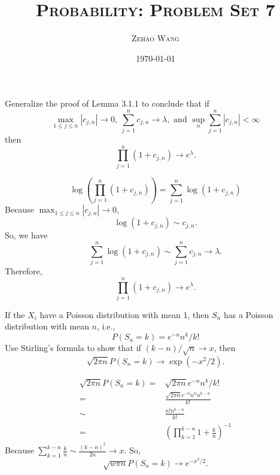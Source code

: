 \documentclass[en, normal, 12pt, black]{elegantnote}
\title{\textsc{Probability: Problem Set 7}}
\author{\textsc{Zehao Wang}}
\date{\today}
\newenvironment{exercise}[1]{\begin{tcolorbox}[colback=black!15, colframe=black!80, breakable, title=#1]}{\end{tcolorbox}}
\newenvironment{solution}{\begin{tcolorbox}[colback=white, colframe=black!50, breakable, title=Solution. ]\setlength{\parskip}{0.8em}}{\end{tcolorbox}}
\begin{document}
    \maketitle

    \begin{exercise}{3.1.1}
        Generalize the proof of Lemma 3.1.1 to conclude that if \[\max_{1 \leqslant j \leqslant n}\left|c_{j, n}\right| \rightarrow 0,\ \sum_{j=1}^{n} c_{j, n} \rightarrow \lambda,\text{ and }\sup _{n} \sum_{j=1}^{n}\left|c_{j, n}\right|<\infty\]
        then \[\prod_{j=1}^{n}\left(1+c_{j, n}\right) \rightarrow e^{\lambda}. \]
    \end{exercise}

    \begin{solution}
        \[
            \log \left(\prod_{j=1}^{n}\left(1+c_{j, n}\right)\right)=\sum_{j=1}^{n}\log(1+c_{j,n})
        \]
        Because $\max_{1 \leqslant j \leqslant n}\left|c_{j, n}\right| \rightarrow 0$, 
        \[
            \log(1+c_{j,n})\sim c_{j,n}. 
        \]
        So, we have 
        \[
            \sum_{j=1}^{n}\log(1+c_{j,n})\sim\sum_{j=1}^{n}c_{j,n}\rightarrow \lambda. 
        \]
        Therefore, 
        \[
            \prod_{j=1}^{n}\left(1+c_{j, n}\right)\rightarrow e^\lambda. 
        \]
    \end{solution}


    \begin{exercise}{3.1.2}
        If the $X_{i}$ have a Poisson distribution with mean 1, then $S_{n}$ has a Poisson distribution with mean $n$, i.e., 
        \[P\left(S_{n}=k\right)=e^{-n} n^{k} / k !\]
        Use Stirling's formula to show that if $(k-n) / \sqrt{n} \rightarrow x$, then
        \[
            \sqrt{2 \pi n} P\left(S_{n}=k\right) \rightarrow \exp \left(-x^{2} / 2\right). 
        \]
    \end{exercise}

    \begin{solution}
        \begin{align*}
            \sqrt{2\pi n}P(S_n=k)=&\sqrt{2\pi n}e^{-n} n^{k} / k !\\
            = &\frac{\sqrt{2\pi n}e^{-n}n^{n}n^{k-n}}{k!}\\
            \sim &\frac{n!n^{k-n}}{k!}\\
            =&\left(\prod_{k=1}^{k-n} 1+\frac{k}{n}\right)^{-1}
        \end{align*}
        Because $\sum_{k=1}^{k-n}\frac{k}{n}\sim\frac{(k-n)^2}{2n}\to x$. So, 
        \[
            \sqrt{w\pi n}P(S_n=k)\to e^{-x^2/2}. 
        \]
    \end{solution}
\end{document}
